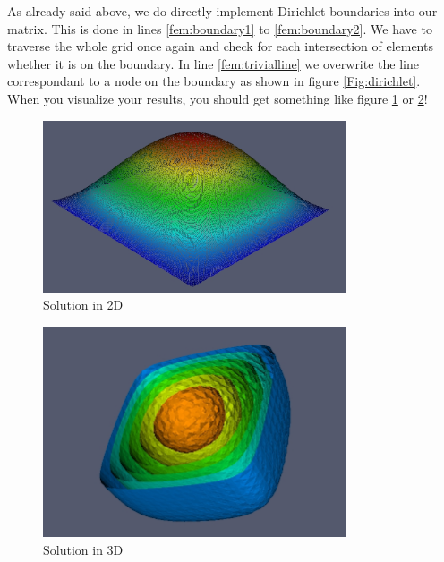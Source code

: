 \documentclass[11pt,a4paper,headinclude,footinclude,DIV16,normalheadings]{scrreprt}
\begin{document}
As already said above, we do directly implement Dirichlet boundaries into our matrix. This is done in lines \ref{fem:boundary1} to \ref{fem:boundary2}. We have to traverse the whole grid once again and check for each intersection of elements whether it is on the boundary. In line \ref{fem:trivialline} we overwrite the line correspondant to a node on the boundary as shown in figure \ref{Fig:dirichlet}. \\

When you visualize your results, you should get something like figure \ref{Fig:FEM1} or \ref{Fig:FEM2}!

\begin{figure}[h]
\label{Fig:FEM1}
\begin{center}
\includegraphics[width=0.8\textwidth]{./EPS/fem2d} 
\caption{Solution in 2D}
\end{center}
\end{figure}

\begin{figure}[h]
\label{Fig:FEM2}
\begin{center}
\includegraphics[width=0.8\textwidth]{./EPS/fem3d} 
\caption{Solution in 3D}
\end{center}
\end{figure}
\end{document}
